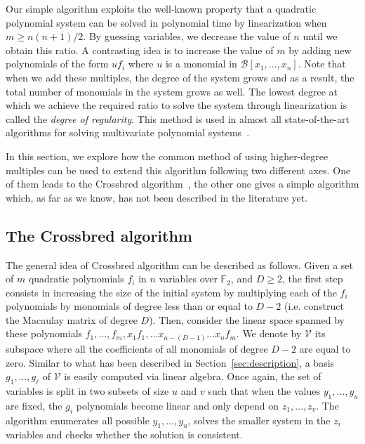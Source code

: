 \documentclass[a4paper,UKenglish,cleveref, autoref]{lipics-v2019}
\begin{document}
  
  Our simple algorithm exploits the well-known property that a quadratic polynomial system can be solved in polynomial time by linearization when $m \geq n(n+1)/2$.
  By guessing variables, we decrease the value of $n$ until we obtain this ratio. A contrasting idea is to increase the value of $m$ by adding new polynomials of the form $uf_i$ where $u$ is a monomial in $\mathcal{B}[x_1, \dots, x_n]$.
  Note that when we add these multiples, the degree of the system grows and as a result, the total number of monomials in the system grows as well. The lowest degree at which we achieve the required ratio to solve the system through linearization is called the \textit{degree of regularity}. This method is used in almost all state-of-the-art algorithms for solving multivariate polynomial systems~\cite{F4,F5,CourtoisKPS00,BardetFSS13,JouxV17}. 
  
  In this section, we explore how the common method of using higher-degree multiples can be used to extend this algorithm following two different axes.
  One of them leads to the \textsf{Crossbred} algorithm~\cite{JouxV17}, the other
  one gives a simple algorithm which, as far as we know, has not been described
  in the literature yet.
  
  
  \subsection{The \textsf{Crossbred} algorithm}\label{sec:JV}
  
  The general idea of \textsf{Crossbred} algorithm can be described as follows.
  Given a set of $m$ quadratic polynomials $f_i$ in $n$ variables over $\mathbb{F}_2$, 
  and $D \geq 2$, the first step consists in
  increasing the size of the initial system by multiplying each of the $f_i$
  polynomials by monomials of degree less than or equal to $D-2$ 
  (i.e. construct the Macaulay matrix of degree $D$).
  Then, consider the linear space spanned 
  by these polynomials $f_1, \dots, f_m, x_1f_1, \dots x_{n-(D-1)}\dots x_{n}f_m$. 
  We denote by $\mathcal{V}$ its subspace where all the coefficients of all 
  monomials of degree $D -2$ are equal to zero. Similar to what has been 
  described in Section~\ref{sec:description}, a basis $g_1, \dots, g_\ell$ of
  $\mathcal{V}$ is easily computed via linear algebra. Once again, the set of variables
  is split in two subsets of size $u$ and $v$ such that when the values $y_1, \dots, y_u$
  are fixed, the $g_i$ polynomials become linear and only depend on $z_1, \dots, z_v$.
  The algorithm enumerates all possible $y_1, \dots, y_u$, solves the smaller system in the $z_i$
  variables and checks whether the solution is consistent.
  
\end{document}

